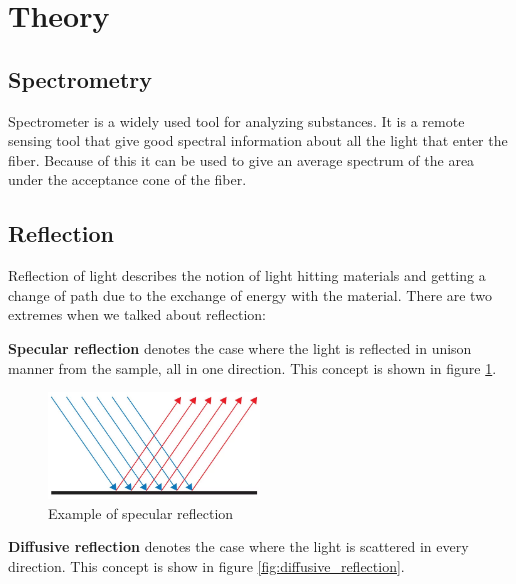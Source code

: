 \section{Theory}

\subsection{Spectrometry}
Spectrometer is a widely used tool for analyzing substances. It is a remote sensing tool that give good spectral information about all the light that enter the fiber. Because of this it can be used to give an average spectrum of the area under the acceptance cone of the fiber. 

\subsection{Reflection}
Reflection of light describes the notion of light hitting materials and getting a change of path due to the exchange of energy with the material. There are two extremes when we talked about reflection:

\textbf{Specular reflection} denotes the case where the light is reflected in unison manner from the sample, all in one direction. This concept is shown in figure \ref{fig:specular_reflection}.

\begin{figure}[h!]
    \centering
    \includegraphics[width=0.5\textwidth]{figures/theory/Specular-Reflection.png}
    \caption{Example of specular reflection \cite{SpecularReflectionOcean}}
    \label{fig:specular_reflection}
\end{figure}

\textbf{Diffusive reflection} denotes the case where the light is scattered in every direction. This concept is show in figure \ref{fig:diffusive_reflection}.

